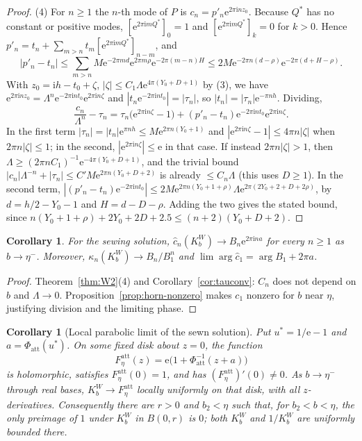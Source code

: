 \documentclass[11pt]{amsart}
\newtheorem{corollary}[theorem]{Corollary}
\theoremstyle{definition}
\newcommand{\Kk}{K}
\newcommand{\eee}{\mathrm{e}}
\newcommand{\ii}{\mathrm{i}}
\begin{document}
\begin{proof}
(4) For $n\ge1$ the $n$-th mode of $P$ is $c_n=p'_n\eee^{2\pi\ii nz_0}$.
Because $Q^*$ has no constant or positive modes,
$[\eee^{2\pi\ii mQ^*}]_0=1$ and $[\eee^{2\pi\ii mQ^*}]_k=0$ for $k>0$.  Hence
$p'_n=t_n+\sum_{m>n}t_m[\eee^{2\pi\ii mQ^*}]_{n-m}$, and
\[
 |p'_n-t_n|\le\sum_{m>n}M\eee^{-2\pi md}\eee^{2\pi m\rho}\eee^{-2\pi(m-n)H}
 \le2M\eee^{-2\pi n(d-\rho)}\eee^{-2\pi(d+H-\rho)} .
\]
With $z_0=\ii h-t_0+\zeta$, $|\zeta|\le C_1\Lambda\eee^{4\pi(Y_0+D+1)}$ by (3), we have
$\eee^{2\pi\ii nz_0}=\Lambda^n\eee^{-2\pi\ii nt_0}\eee^{2\pi\ii n\zeta}$ and
$|t_n\eee^{-2\pi\ii nt_0}|=|\tau_n|$, so
$|t_n|=|\tau_n|\eee^{-\pi nh}$.  Dividing,
\[
 \frac{c_n}{\Lambda^n}-\tau_n=\tau_n\bigl(\eee^{2\pi\ii n\zeta}-1\bigr)
 +(p'_n-t_n)\eee^{-2\pi\ii nt_0}\eee^{2\pi\ii n\zeta}.
\]
In the first term $|\tau_n|=|t_n|\eee^{\pi nh}\le M\eee^{2\pi n(Y_0+1)}$ and
$|\eee^{2\pi\ii n\zeta}-1|\le4\pi n|\zeta|$ when $2\pi n|\zeta|\le1$; in
the second, $|\eee^{2\pi\ii n\zeta}|\le\eee$ in that case.  If instead
$2\pi n|\zeta|>1$, then
$\Lambda\ge(2\pi nC_1)^{-1}\eee^{-4\pi(Y_0+D+1)}$, and the trivial bound
$|c_n|\Lambda^{-n}+|\tau_n|\le C'M\eee^{2\pi n(Y_0+D+2)}$ is already
$\le C_n\Lambda$ (this uses $D\ge1$).  In the second term,
$|(p'_n-t_n)\eee^{-2\pi\ii nt_0}|\le2M\eee^{2\pi n(Y_0+1+\rho)}\Lambda
\eee^{2\pi(2Y_0+2+D+2\rho)}$, by $d=h/2-Y_0-1$ and $H=d-D-\rho$.  Adding the two
gives the stated bound, since
$n(Y_0+1+\rho)+2Y_0+2D+2.5\le(n+2)(Y_0+D+2)$.
\end{proof}

\begin{corollary}\label{cor:Kw}
For the sewing solution, $\hat c_n(\Kk^W_b)\to B_n\eee^{2\pi\ii na}$ for every
$n\ge1$ as $b\to\eta^-$.  Moreover,
$\kappa_n(\Kk^W_b)\to B_n/B_1^n$ and
$\lim\arg\hat c_1=\arg B_1+2\pi a$.
\end{corollary}

\begin{proof}
Theorem~\ref{thm:W2}(4) and Corollary~\ref{cor:tauconv}: $C_n$ does not depend
on $b$ and $\Lambda\to0$.  Proposition~\ref{prop:horn-nonzero} makes $c_1$
nonzero for $b$ near $\eta$, justifying division and the limiting phase.
\end{proof}

\begin{corollary}[Local parabolic limit of the sewn solution]
\label{cor:sewn-cusp-local}
Put $u^*=1/\eee-1$ and $a=\Phi_{\mathrm{att}}(u^*)$.  On some fixed disk
about $z=0$, the function
\[
 F_\eta^{\mathrm{att}}(z)
 =\eee\bigl(1+\Phi_{\mathrm{att}}^{-1}(z+a)\bigr)
\]
is holomorphic, satisfies $F_\eta^{\mathrm{att}}(0)=1$, and has
$(F_\eta^{\mathrm{att}})'(0)\ne0$.  As $b\to\eta^-$ through real bases,
$\Kk_b^W\to F_\eta^{\mathrm{att}}$ locally uniformly on that disk,
with all $z$-derivatives.  Consequently there are $r>0$ and $b_2<\eta$
such that, for $b_2<b<\eta$, the only preimage of $1$ under $\Kk_b^W$
in $B(0,r)$ is $0$; both $\Kk_b^W$ and $1/\Kk_b^W$ are uniformly
bounded there.
\end{corollary}
\end{document}
